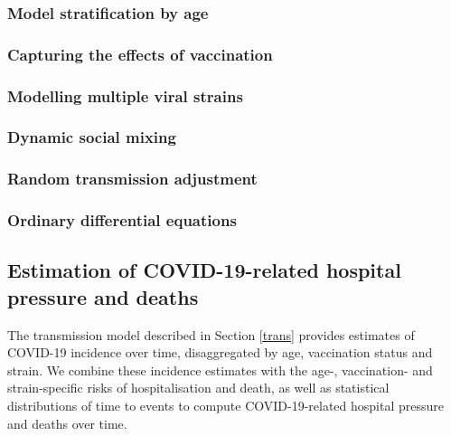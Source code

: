 \subsubsection{Model stratification by age}
\label{age}


\subsubsection{Capturing the effects of vaccination}
\label{vaccination}


\subsubsection{Modelling multiple viral strains}
\label{strains}
 


\subsubsection{Dynamic social mixing}
\label{mixing}
 

\subsubsection{Random transmission adjustment}
\label{random_process}
 

\subsubsection{Ordinary differential equations}
\label{ODEs} 
 

\subsection{Estimation of COVID-19-related hospital pressure and deaths}
The transmission model described in Section \ref{trans} provides estimates of COVID-19 incidence over time, disaggregated by age, vaccination status and strain. 
We combine these incidence estimates with the age-, vaccination- and strain-specific risks of hospitalisation and death, as well as 
statistical distributions of time to events to compute COVID-19-related hospital pressure and deaths over time.

